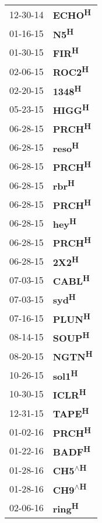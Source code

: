 \begin{supertabular}{p{0.08\textwidth}p{0.2\textwidth}}
 12-30-14 &           \textbf{ECHO\textsuperscript{H}} \\
 01-16-15 &             \textbf{N5\textsuperscript{H}} \\
 01-30-15 &            \textbf{FIR\textsuperscript{H}} \\
 02-06-15 &           \textbf{ROC2\textsuperscript{H}} \\
 02-20-15 &           \textbf{1348\textsuperscript{H}} \\
 05-23-15 &           \textbf{HIGG\textsuperscript{H}} \\
 06-28-15 &           \textbf{PRCH\textsuperscript{H}} \\
 06-28-15 &           \textbf{reso\textsuperscript{H}} \\
 06-28-15 &           \textbf{PRCH\textsuperscript{H}} \\
 06-28-15 &            \textbf{rbr\textsuperscript{H}} \\
 06-28-15 &           \textbf{PRCH\textsuperscript{H}} \\
 06-28-15 &            \textbf{hey\textsuperscript{H}} \\
 06-28-15 &           \textbf{PRCH\textsuperscript{H}} \\
 06-28-15 &            \textbf{2X2\textsuperscript{H}} \\
 07-03-15 &           \textbf{CABL\textsuperscript{H}} \\
 07-03-15 &            \textbf{syd\textsuperscript{H}} \\
 07-16-15 &           \textbf{PLUN\textsuperscript{H}} \\
 08-14-15 &           \textbf{SOUP\textsuperscript{H}} \\
 08-20-15 &           \textbf{NGTN\textsuperscript{H}} \\
 10-26-15 &           \textbf{sol1\textsuperscript{H}} \\
 10-30-15 &           \textbf{ICLR\textsuperscript{H}} \\
 12-31-15 &           \textbf{TAPE\textsuperscript{H}} \\
 01-02-16 &           \textbf{PRCH\textsuperscript{H}} \\
 01-22-16 &           \textbf{BADF\textsuperscript{H}} \\
 01-28-16 &    \textbf{CH5\textsuperscript{$\wedge$H}} \\
 01-28-16 &    \textbf{CH9\textsuperscript{$\wedge$H}} \\
 02-06-16 &           \textbf{ring\textsuperscript{H}} \\

\end{supertabular}
